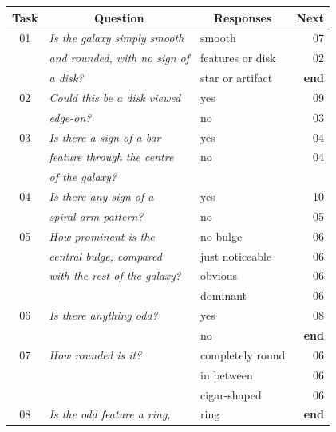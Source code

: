 \documentclass[useAMS,usenatbib]{mn2e}
\begin{document}
\begin{table}
 \begin{tabular}{@{}cllr}
 \hline
\multicolumn{1}{l}{Task} &
\multicolumn{1}{c}{Question} &
\multicolumn{1}{c}{Responses} &
\multicolumn{1}{c}{Next} 
\\ 
\hline
\hline						
01    & {\it Is the galaxy simply smooth   }  & smooth           & 07 \\
      & {\it and rounded, with no sign of  }  & features or disk & 02 \\
      & {\it a disk?                       }  & star or artifact & {\bf end} \\
      \hline
02    & {\it Could this be a disk viewed   }  & yes              & 09 \\
      & {\it edge-on?                      }  & no               & 03 \\
      \hline
03    & {\it Is there a sign of a bar      }  & yes              & 04 \\
      & {\it feature through the centre    }  & no               & 04 \\
      & {\it of the galaxy?                }                                        \\
      \hline
04    & {\it Is there any sign of a        }  & yes              & 10 \\
      & {\it spiral arm pattern?           }  & no               & 05 \\
      \hline
05    & {\it How prominent is the          }  & no bulge         & 06 \\
      & {\it central bulge, compared       }  & just noticeable  & 06 \\
      & {\it with the rest of the galaxy?  }  & obvious          & 06 \\
      & {\it                               }  & dominant         & 06 \\
      \hline
06    & {\it Is there anything odd?        }  & yes              & 08 \\ 
      & {\it                               }  & no               & {\bf end}        \\
      \hline
07    & {\it How rounded is it?            }  & completely round & 06 \\
      & {\it                               }  & in between       & 06 \\
      & {\it                               }  & cigar-shaped     & 06 \\
      \hline
08    & {\it Is the odd feature a ring,    }  & ring             & {\bf end}        \\

\end{tabular}
\end{table}
\end{document}
